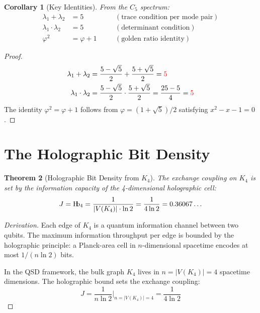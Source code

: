 \documentclass[11pt,a4paper]{article}
\newtheorem{theorem}{Theorem}[section]
\newtheorem{corollary}[theorem]{Corollary}
\theoremstyle{definition}
\newcommand{\Hb}{\textnormal{H\kern-0.3em b}}
\newcommand{\Hbfour}{\Hb_4}
\begin{document}
\begin{corollary}[Key Identities]
\label{S1:cor:identities}
From the $C_5$ spectrum:
\begin{align}
\lambda_1 + \lambda_2 &= 5 &\quad &(\text{trace condition per mode pair}) \label{S1:eq:lam_sum}\\
\lambda_1 \cdot \lambda_2 &= 5 &\quad &(\text{determinant condition}) \label{S1:eq:lam_prod}\\
\varphi^2 &= \varphi + 1 &\quad &(\text{golden ratio identity}) \label{S1:eq:phi_identity}
\end{align}
\end{corollary}

\begin{proof}
\begin{align}
    \lambda_1 + \lambda_2 & = \frac{5-\sqrt{5}}{2} + \frac{5+\sqrt{5}}{2} = \color{red} 5 \\ 
    \lambda_1 \cdot\lambda_2 & = \frac{5-\sqrt{5}}{2} \cdot\frac{5+\sqrt{5}}{2} = \frac{25-5}{4} = \color{red} 5 \\
\end{align}
The identity $\varphi^2 = \varphi + 1$ follows from $\varphi = (1+\sqrt{5})/2$ satisfying $x^2 - x - 1 = 0$.
\end{proof}

\section{The Holographic Bit Density}
\label{sec:hb4}

\begin{theorem}[Holographic Bit Density from $K_4$]
\label{S1:thm:hb4}
The exchange coupling on $K_4$ is set by the information capacity of the 4-dimensional holographic cell:
\begin{equation}
J = \Hbfour = \frac{1}{|V(K_4)| \cdot \ln 2} = \frac{1}{4\ln 2} = 0.36067\ldots
\label{S1:eq:hb4}
\end{equation}
\end{theorem}

\begin{proof}[Derivation]
Each edge of $K_4$ is a quantum information channel between two qubits. The maximum information throughput per edge is bounded by the holographic principle: a Planck-area cell in $n$-dimensional spacetime encodes at most $1/(n \ln 2)$ bits.

In the QSD framework, the bulk graph $K_4$ lives in $n = |V(K_4)| = 4$ spacetime dimensions. The holographic bound sets the exchange coupling:
\begin{equation}
J = \frac{1}{n \ln 2}\bigg|_{n=|V(K_4)|=4} = \frac{1}{4\ln 2}
\end{equation}
\end{proof}
\end{document}
